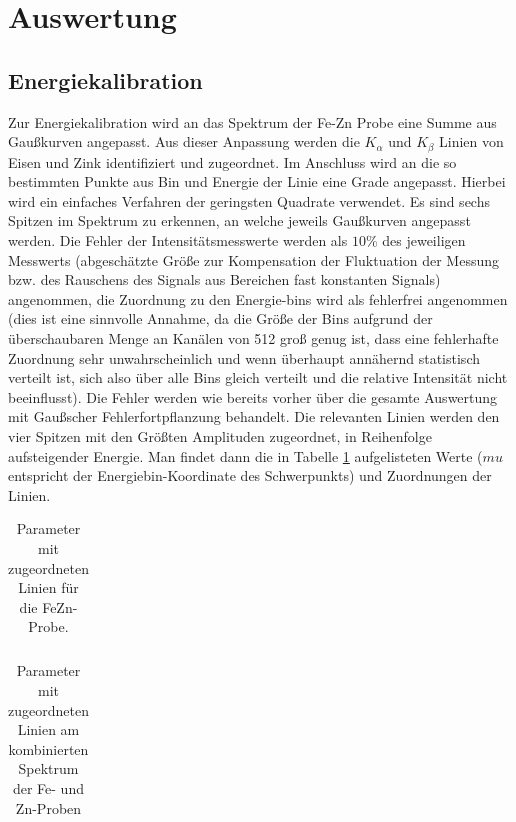 \section{Auswertung}
\subsection{Energiekalibration}
Zur Energiekalibration wird an das Spektrum der Fe-Zn Probe eine Summe aus Gaußkurven angepasst. Aus dieser Anpassung werden die $K_\alpha$ und $K_\beta$ Linien von Eisen und Zink identifiziert und zugeordnet. Im Anschluss wird an die so bestimmten Punkte aus Bin und Energie der Linie eine Grade angepasst. Hierbei wird ein einfaches Verfahren der geringsten Quadrate verwendet. Es sind sechs Spitzen im Spektrum zu erkennen, an welche jeweils Gaußkurven angepasst werden. Die Fehler der Intensitätsmesswerte werden als $10\%$ des jeweiligen Messwerts (abgeschätzte Größe zur Kompensation der Fluktuation der Messung bzw. des Rauschens des Signals aus Bereichen fast konstanten Signals) angenommen, die Zuordnung zu den Energie-bins wird als fehlerfrei angenommen (dies ist eine sinnvolle Annahme, da die Größe der Bins aufgrund der überschaubaren Menge an Kanälen von 512 groß genug ist, dass eine fehlerhafte Zuordnung sehr unwahrscheinlich und wenn überhaupt annähernd statistisch verteilt ist, sich also über alle Bins gleich verteilt und die relative Intensität nicht beeinflusst). Die Fehler werden wie bereits vorher über die gesamte Auswertung mit Gaußscher Fehlerfortpflanzung behandelt.
Die relevanten Linien werden den vier Spitzen mit den Größten Amplituden zugeordnet, in Reihenfolge aufsteigender Energie. Man findet dann die in Tabelle \ref{tab:energy_cal} aufgelisteten Werte ($mu$ entspricht der Energiebin-Koordinate des Schwerpunkts) und Zuordnungen der Linien.

\begin{table}[H]
	\centering
	\begin{tabular}{|c|c|c|c|} \hline
		
	\end{tabular}
	\caption{Parameter mit zugeordneten Linien für die FeZn-Probe.}
	\label{tab:energy_cal}
\end{table}

\begin{table}[H]
	\centering
	\begin{tabular}{|c|c|c|c|} \hline
		
	\end{tabular}
	\caption{Parameter mit zugeordneten Linien am kombinierten Spektrum der Fe- und Zn-Proben}
	\label{tab:energy_cal_better}
\end{table}

